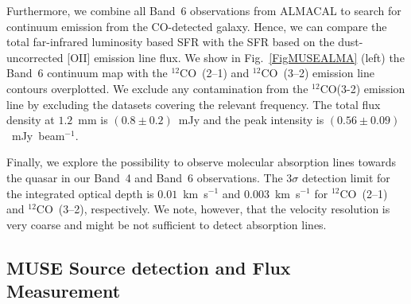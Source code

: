 \documentclass[a4paper,fleqn,usenatbib]{mnras}
\begin{document}
Furthermore, we combine all Band~6 observations from ALMACAL to search for continuum emission from the CO-detected galaxy. Hence, we can compare the total far-infrared luminosity based SFR with the SFR based on the dust-uncorrected [OII] emission line flux. We show in Fig.~\ref{FigMUSEALMA} (left) the Band~6 continuum map with the $^{12}$CO~(2--1) and $^{12}$CO~(3--2) emission line contours overplotted. We exclude any contamination from the $^{12}$CO(3-2) emission line by excluding the datasets covering the relevant frequency. The total flux density at $1.2$~mm is $(0.8 \pm0.2)$~mJy and the peak intensity is $(0.56 \pm 0.09)$~mJy~beam$^{-1}$.%

Finally, we explore the possibility to observe molecular absorption lines towards the quasar in our Band~4 and Band~6 observations. The $3\sigma$ detection limit for the integrated optical depth is $0.01$~km~s$^{-1}$ and $0.003$~km~s$^{-1}$ for $^{12}$CO~(2--1) and $^{12}$CO~(3--2), respectively. We note, however, that the velocity resolution is very coarse and might be not sufficient to detect absorption lines.

\subsection{MUSE Source detection and Flux Measurement}
\label{SecSourceMUSE}
\end{document}
